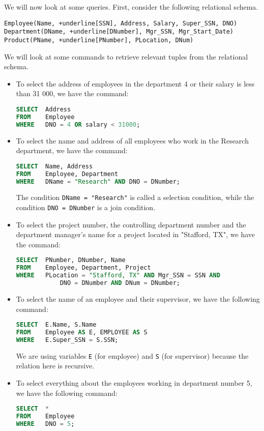 \documentclass[a4paper, openany]{memoir}
\begin{document}
We will now look at some queries. First, consider the following relational schema.
\begin{Verbatim}[commandchars=+\[\]]
Employee(Name, +underline[SSN], Address, Salary, Super_SSN, DNO)
Department(DName, +underline[DNumber], Mgr_SSN, Mgr_Start_Date)
Product(PName, +underline[PNumber], PLocation, DNum)
\end{Verbatim}
We will look at some commands to retrieve relevant tuples from the relational schema.
\begin{itemize}
    \item To select the address of employees in the department 4 or their salary is less than 31 000, we have the command:
\begin{lstlisting}[language=SQL]
SELECT  Address
FROM    Employee
WHERE   DNO = 4 OR salary < 31000;
\end{lstlisting}
    
    \item To select the name and address of all employees who work in the Research department, we have the command:
\begin{lstlisting}[language=SQL]
SELECT  Name, Address
FROM    Employee, Department
WHERE   DName = "Research" AND DNO = DNumber;
\end{lstlisting}
    The condition \texttt{DName = "Research"} is called a selection condition, while the condition \texttt{DNO = DNumber} is a join condition.
    
    \item To select the project number, the controlling department number and the department manager's name for a project located in "Stafford, TX", we have the command:
\begin{lstlisting}[language=SQL]
SELECT  PNumber, DNumber, Name
FROM    Employee, Department, Project
WHERE   PLocation = "Stafford, TX" AND Mgr_SSN = SSN AND 
            DNO = DNumber AND DNum = DNumber;
\end{lstlisting}

    \item To select the name of an employee and their supervisor, we have the following command:
\begin{lstlisting}[language=SQL]
SELECT  E.Name, S.Name
FROM    Employee AS E, EMPLOYEE AS S
WHERE   E.Super_SSN = S.SSN;
\end{lstlisting}
    We are using variables \texttt{E} (for employee) and \texttt{S} (for supervisor) because the relation here is recursive.
    
    \item To select everything about the employees working in department number 5, we have the following command:
\begin{lstlisting}[language=SQL]
SELECT  *
FROM    Employee
WHERE   DNO = 5;
\end{lstlisting}
    

\end{itemize}
\end{document}

